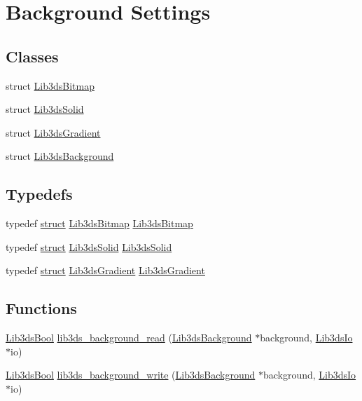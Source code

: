 \hypertarget{group__background}{\section{Background Settings}
\label{group__background}
}
\subsection*{Classes}
\begin{DoxyCompactItemize}
\item 
struct \hyperlink{struct_lib3ds_bitmap}{Lib3ds\-Bitmap}
\item 
struct \hyperlink{struct_lib3ds_solid}{Lib3ds\-Solid}
\item 
struct \hyperlink{struct_lib3ds_gradient}{Lib3ds\-Gradient}
\item 
struct \hyperlink{struct_lib3ds_background}{Lib3ds\-Background}
\end{DoxyCompactItemize}
\subsection*{Typedefs}
\begin{DoxyCompactItemize}
\item 
typedef \hyperlink{sdlgamepad_8dox_aba655c5729da86df745f0c8e7f9ba8d2}{struct} \hyperlink{struct_lib3ds_bitmap}{Lib3ds\-Bitmap} \hyperlink{group__background_ga83052a1c5ed9a6fb4d9bc2343b35fbe5}{Lib3ds\-Bitmap}
\item 
typedef \hyperlink{sdlgamepad_8dox_aba655c5729da86df745f0c8e7f9ba8d2}{struct} \hyperlink{struct_lib3ds_solid}{Lib3ds\-Solid} \hyperlink{group__background_ga7656460cff3f1a2e6e0e9f7d61ab71d0}{Lib3ds\-Solid}
\item 
typedef \hyperlink{sdlgamepad_8dox_aba655c5729da86df745f0c8e7f9ba8d2}{struct} \hyperlink{struct_lib3ds_gradient}{Lib3ds\-Gradient} \hyperlink{group__background_gaf3076a8fd0597515777e39cb4bbcd3ba}{Lib3ds\-Gradient}
\end{DoxyCompactItemize}
\subsection*{Functions}
\begin{DoxyCompactItemize}
\item 
\hyperlink{types_8h_a89dd7398a9ebbbf28011f8c32df67ad3}{Lib3ds\-Bool} \hyperlink{group__background_gaa5affc3d83fb711f564ba6b0fda05390}{lib3ds\-\_\-background\-\_\-read} (\hyperlink{struct_lib3ds_background}{Lib3ds\-Background} $\ast$background, \hyperlink{struct_lib3ds_io}{Lib3ds\-Io} $\ast$io)
\item 
\hyperlink{types_8h_a89dd7398a9ebbbf28011f8c32df67ad3}{Lib3ds\-Bool} \hyperlink{group__background_gacd5ba40c9c253965d58ac7962c4589fb}{lib3ds\-\_\-background\-\_\-write} (\hyperlink{struct_lib3ds_background}{Lib3ds\-Background} $\ast$background, \hyperlink{struct_lib3ds_io}{Lib3ds\-Io} $\ast$io)
\end{DoxyCompactItemize}



